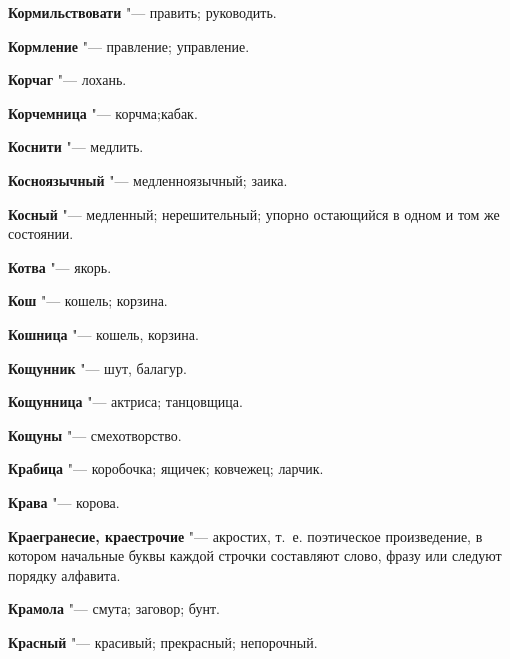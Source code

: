\begin{mymulticols}{2}
\noindent\textbf{Кормильствовати} "--- править; руководить. 




\noindent\textbf{Кормление} "--- правление; управление. 




\noindent\textbf{Корчаг} "--- лохань. 




\noindent\textbf{Корчемница} "--- корчма;кабак. 




\noindent\textbf{Коснити} "--- медлить. 




\noindent\textbf{Косноязычный} "--- медленноязычный; заика. 




\noindent\textbf{Косный} "--- медленный; нерешительный; упорно остающийся в одном и том же состоянии. 




\noindent\textbf{Котва} "--- якорь. 




\noindent\textbf{Кош} "--- кошель; корзина. 




\noindent\textbf{Кошница} "--- кошель, корзина. 




\noindent\textbf{Кощунник} "--- шут, балагур. 




\noindent\textbf{Кощунница} "--- актриса; танцовщица. 




\noindent\textbf{Кощуны} "--- смехотворство. 




\noindent\textbf{Крабица} "--- коробочка; ящичек; ковчежец; ларчик. 




\noindent\textbf{Крава} "--- корова. 




\noindent\textbf{Краегранесие, краестрочие} "--- акростих, т.~е. поэтическое произведение, в котором начальные буквы каждой строчки составляют слово, фразу или следуют порядку алфавита. 




\noindent\textbf{Крамола} "--- смута; заговор; бунт. 




\noindent\textbf{Красный} "--- красивый; прекрасный; непорочный. 





\end{mymulticols}
